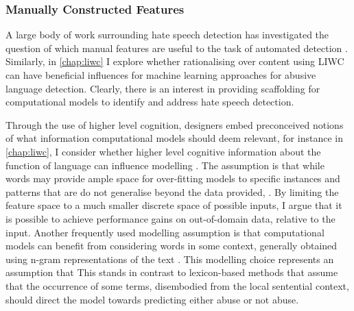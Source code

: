 \subsubsection{Manually Constructed Features}
A large body of work surrounding hate speech detection has investigated the question of which manual features are useful to the task of automated detection \citep{Waseem:2016,Chiril:2019,Fortuna:2018,Stankovic:2020}.
Similarly, in \autoref{chap:liwc} I explore whether rationalising over content using LIWC can have beneficial influences for machine learning approaches for abusive language detection.
Clearly, there is an interest in providing scaffolding for computational models to identify and address hate speech detection.

Through the use of higher level cognition, designers embed preconceived notions of what information computational models should deem relevant, for instance in \autoref{chap:liwc}, I consider whether higher level cognitive information about the function of language can influence modelling .
The assumption is that while words may provide ample space for over-fitting models to specific instances and patterns that are do not generalise beyond the data provided, .
By limiting the feature space to a much smaller discrete space of possible inputs, I argue that it is possible to achieve performance gains on out-of-domain data, relative to the input.
Another frequently used modelling assumption is that computational models can benefit from considering words in some context, generally obtained using n-gram representations of the text \citep{Waseem-Hovy:2016,Davidson:2017,Chiril:2019}.
This modelling choice represents an assumption that 
This stands in contrast to lexicon-based methods \citep{Hurtlex:2019} that assume that the occurrence of some terms, disembodied from the local sentential context, should direct the model towards predicting either abuse or not abuse.

